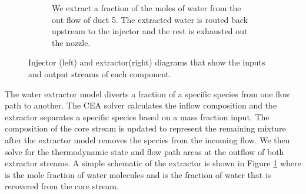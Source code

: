 \documentclass[conf]{new-aiaa}
\begin{document}
\begin{figure}[hbt!]
\begin{subfigure}[t]{0.49\textwidth}
        \caption{
            We extract a fraction of the moles of water from the out flow of duct 5.
            The extracted water is routed back upstream to the injector and the rest is exhausted out the nozzle.
        }
        \label{fig:extractor}
    \end{subfigure}
    \caption{Injector (left) and extractor(right) diagrams that show the inputs and output streams of each component.}
    \label{fig:extract_inject}
\end{figure}


The water extractor model diverts a fraction of a specific species from one flow path to another.
The CEA solver calculates the inflow composition and the extractor separates a specific species based on a mass fraction input.
The composition of the core stream is updated to represent the remaining mixture after the extractor model removes the species from the incoming flow.
We then solve for the thermodynamic state and flow path areas at the outflow of both extractor streams.
A simple schematic of the extractor is shown in Figure \ref{fig:extractor} where  is the mole fraction of water molecules and  is the fraction of water that is recovered from the core stream.
\end{document}
